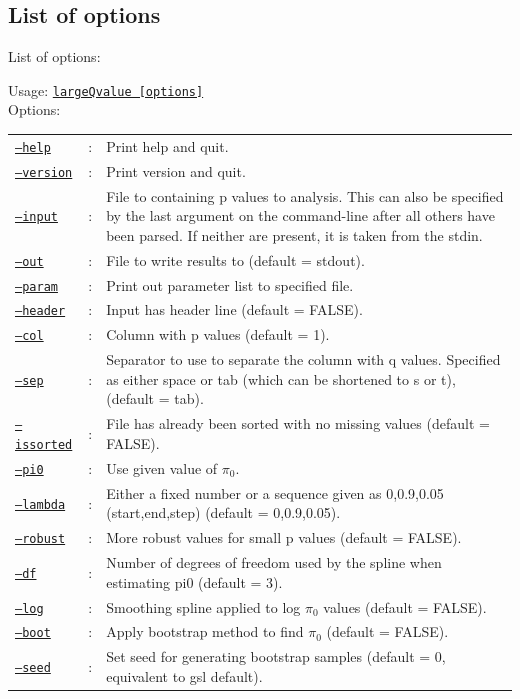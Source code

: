 \documentclass{amsart}
\begin{document}
\begin{framed}
  \subsection{List of options}

  \noindent List of options:

  \noindent Usage: \underline{\texttt{largeQvalue [options]}}\\
  \noindent Options:

 \begin{tabular}{llp{9cm}}
    \underline{\texttt{--help}}    & : &Print help and quit. \\
    \underline{\texttt{--version}} & : &Print version and quit. \\
    \underline{\texttt{--input}}   & : &File to containing p values to analysis. This can also be specified by the last argument on the command-line after all others have been parsed. If neither are present, it is taken from the stdin.\\
    \underline{\texttt{--out}}     & : &File to write results to (default = stdout). \\
    \underline{\texttt{--param}}   & : &Print out parameter list to specified file. \\
    \underline{\texttt{--header}}  & : &Input has header line (default = FALSE). \\
    \underline{\texttt{--col}}     & : &Column with p values (default = 1). \\
    \underline{\texttt{--sep}}     & : &Separator to use to separate the column with q values. Specified as either space or tab (which can be shortened to s or t), (default = tab). \\
    \underline{\texttt{--issorted}}& : &File has already been sorted with no missing values (default = FALSE). \\
    \underline{\texttt{--pi0}}     & : &Use given value of $\pi_0$. \\
    \underline{\texttt{--lambda}}  & : &Either a fixed number or a sequence given as 0,0.9,0.05 (start,end,step) (default = 0,0.9,0.05). \\
    \underline{\texttt{--robust}}  & : &More robust values for small p values (default = FALSE). \\
    \underline{\texttt{--df}}      & : &Number of degrees of freedom used by the spline when estimating pi0 (default = 3). \\ 
    \underline{\texttt{--log}}     & : &Smoothing spline applied to log $\pi_0$ values (default = FALSE). \\
    \underline{\texttt{--boot}}    & : &Apply bootstrap method to find $\pi_0$ (default = FALSE). \\
    \underline{\texttt{--seed}}    & : &Set seed for generating bootstrap samples (default = 0, equivalent to gsl default). \\
\end{tabular}
\end{framed}
\end{document}
